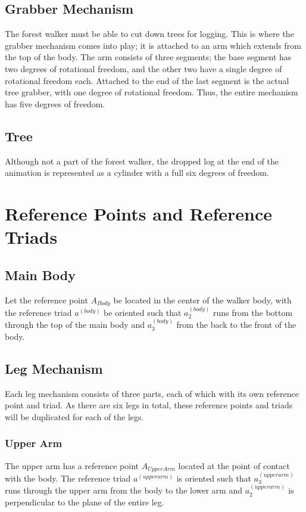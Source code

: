 \documentclass{article}
\begin{document}
\subsection{Grabber Mechanism}%
The forest walker must be able to cut down trees for logging. This is where the grabber mechanism comes into play; it is attached to an arm which extends from the top of the body. The arm consists of three segments; the base segment has two degrees of rotational freedom, and the other two have a single degree of rotational freedom each. Attached to the end of the last segment is the actual tree grabber, with one degree of rotational freedom. Thus, the entire mechanism has five degrees of freedom.%

\subsection{Tree}%
Although not a part of the forest walker, the dropped log at the end of the animation is represented as a cylinder with a full six degrees of freedom.%

\section{Reference Points and Reference Triads} %

\subsection{Main Body } %
Let the reference point $A_{Body}$ be located in the center of the walker body, with the reference triad $a^{(body)}$ be oriented such that $a_2^{(body)}$ runs from the bottom through the top of the main body and $a_3^{(body)}$ from the back to the front of the body.%

\subsection{Leg Mechanism} %
Each leg mechanism consists of three parts, each of which with its own reference point and triad. As there are six legs in total, these reference points and triads will be duplicated for each of the legs.

\subsubsection{Upper Arm}%
The upper arm has a reference point $A_{UpperArm}$ located at the point of contact with the body. The reference triad $a^{(upperarm)}$ is oriented such that $a_3^{(upperarm)}$ runs through the upper arm from the body to the lower arm and $a_2^{(upperarm)}$ is perpendicular to the plane of the entire leg.%
\end{document}
